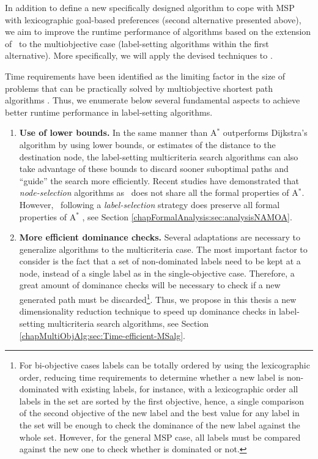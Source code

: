 In addition to define a new specifically designed algorithm to cope with MSP with lexicographic goal-based preferences (second alternative presented above), we aim to improve the runtime performance of algorithms based on the extension of \astar \ to the multiobjective case (label-setting algorithms within the first alternative). More specifically, we will apply the devised techniques to \namoa. 

Time requirements have been identified as the limiting factor in the size of problems that can be practically solved by multiobjective shortest path algorithms \citep{Machuca2009, Machuca2012, Mali2012}. Thus, we enumerate below several fundamental aspects to achieve better runtime performance in label-setting algorithms.

\begin{enumerate}
	\item \textbf{Use of lower bounds.} In the same manner than A$^*$ outperforms Dijkstra's algorithm by using lower bounds, or estimates of the distance to the destination node, the label-setting multicriteria search algorithms can also take advantage of these bounds to discard sooner suboptimal paths and ``guide'' the search more efficiently. Recent studies have demonstrated that \textit{node-selection} algorithms as \moa \ does not share all the formal properties of A$^*$. However, \namoa \ following a \textit{label-selection} strategy does preserve all formal properties of A$^*$ \citep{Mandow2010}, see Section \ref{chapFormalAnalysis:sec:analysisNAMOA}. 
	
    \item \textbf{More efficient dominance checks.} Several adaptations are necessary to generalize algorithms to the multicriteria case. The most important factor to consider is the fact that a set of non-dominated labels need to be kept at a node, instead of a single label as in the single-objective case. Therefore, a great amount of dominance checks will be necessary to check if a new generated path must be discarded\footnote{For bi-objective cases labels can be totally ordered by using the lexicographic order, reducing time requirements to determine whether a new label is non-dominated with existing labels, for instance, with a lexicographic order all labels in the set are sorted by the first objective, hence, a single comparison of the second objective of the new label and the best value for any label in the set will be enough to check the dominance of the new label against the whole set. However, for the general MSP case, all labels must be compared against the new one to check whether is dominated or not.}. Thus, we propose in this thesis a new dimensionality reduction technique to speed up dominance checks in label-setting multicriteria search algorithms, see Section \ref{chapMultiObjAlg:sec:Time-efficient-MSalg}.
	

\end{enumerate}
